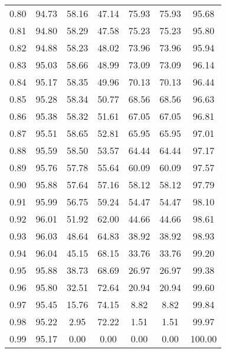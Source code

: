 \begin{tabular}{|c|c|c|c|c|c|c|}
      0.80 &     94.73 &     58.16 &      47.14 &   75.93 &      75.93 &         95.68 \\
      0.81 &     94.80 &     58.29 &      47.58 &   75.23 &      75.23 &         95.80 \\
      0.82 &     94.88 &     58.23 &      48.02 &   73.96 &      73.96 &         95.94 \\
      0.83 &     95.03 &     58.66 &      48.99 &   73.09 &      73.09 &         96.14 \\
      0.84 &     95.17 &     58.35 &      49.96 &   70.13 &      70.13 &         96.44 \\
      0.85 &     95.28 &     58.34 &      50.77 &   68.56 &      68.56 &         96.63 \\
      0.86 &     95.38 &     58.32 &      51.61 &   67.05 &      67.05 &         96.81 \\
      0.87 &     95.51 &     58.65 &      52.81 &   65.95 &      65.95 &         97.01 \\
      0.88 &     95.59 &     58.50 &      53.57 &   64.44 &      64.44 &         97.17 \\
      0.89 &     95.76 &     57.78 &      55.64 &   60.09 &      60.09 &         97.57 \\
      0.90 &     95.88 &     57.64 &      57.16 &   58.12 &      58.12 &         97.79 \\
      0.91 &     95.99 &     56.75 &      59.24 &   54.47 &      54.47 &         98.10 \\
      0.92 &     96.01 &     51.92 &      62.00 &   44.66 &      44.66 &         98.61 \\
      0.93 &     96.03 &     48.64 &      64.83 &   38.92 &      38.92 &         98.93 \\
      0.94 &     96.04 &     45.15 &      68.15 &   33.76 &      33.76 &         99.20 \\
      0.95 &     95.88 &     38.73 &      68.69 &   26.97 &      26.97 &         99.38 \\
      0.96 &     95.80 &     32.51 &      72.64 &   20.94 &      20.94 &         99.60 \\
      0.97 &     95.45 &     15.76 &      74.15 &    8.82 &       8.82 &         99.84 \\
      0.98 &     95.22 &      2.95 &      72.22 &    1.51 &       1.51 &         99.97 \\
      0.99 &     95.17 &      0.00 &       0.00 &    0.00 &       0.00 &        100.00 \\
\bottomrule
\end{tabular}
